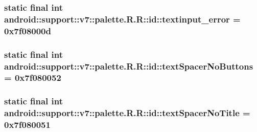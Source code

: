 \hypertarget{classandroid_1_1support_1_1v7_1_1palette_1_1_r_1_1id_23a27c57d0391b51ae60155c1305affc}{
\subsubsection[{textinput\_\-error}]{\setlength{\rightskip}{0pt plus 5cm}static final int android::support::v7::palette.R.R::id::textinput\_\-error = 0x7f08000d}}
\label{classandroid_1_1support_1_1v7_1_1palette_1_1_r_1_1id_23a27c57d0391b51ae60155c1305affc}


\hypertarget{classandroid_1_1support_1_1v7_1_1palette_1_1_r_1_1id_d5c5705cfff5d4484f44f0673e1f4333}{
\subsubsection[{textSpacerNoButtons}]{\setlength{\rightskip}{0pt plus 5cm}static final int android::support::v7::palette.R.R::id::textSpacerNoButtons = 0x7f080052}}
\label{classandroid_1_1support_1_1v7_1_1palette_1_1_r_1_1id_d5c5705cfff5d4484f44f0673e1f4333}


\hypertarget{classandroid_1_1support_1_1v7_1_1palette_1_1_r_1_1id_7ac6c5a39041f37d83dd7444b6073145}{
\subsubsection[{textSpacerNoTitle}]{\setlength{\rightskip}{0pt plus 5cm}static final int android::support::v7::palette.R.R::id::textSpacerNoTitle = 0x7f080051}}
\label{classandroid_1_1support_1_1v7_1_1palette_1_1_r_1_1id_7ac6c5a39041f37d83dd7444b6073145}



